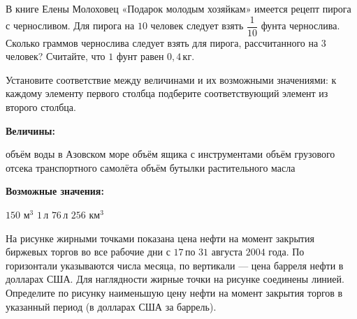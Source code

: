 \begin{class}[number=6]
	\begin{listofex}
		\item В книге Елены Молоховец «Подарок молодым хозяйкам» имеется рецепт пирога с черносливом. Для пирога на \(10\) человек следует взять \(\dfrac{ 1 }{ 10 }\) фунта чернослива. Сколько граммов чернослива следует взять для пирога, рассчитанного на \(3\) человек? Считайте, что \(1\) фунт равен \(0,4\) кг.
		\item Установите соответствие между величинами и их возможными значениями: к каждому элементу первого столбца подберите соответствующий элемент из второго столбца. \\
		\begin{minipage}[t]{0.58\linewidth}
			\textbf{Величины:}
			\begin{tasks}
				\task объём воды в Азовском море
				\task объём ящика с инструментами
				\task объём грузового отсека транспортного самолёта
				\task объём бутылки растительного масла
			\end{tasks}
		\end{minipage}
		\hspace{0.05\linewidth}
		\begin{minipage}[t]{\textwidth}
			\textbf{Возможные значения:}
			\begin{tasks}
				\task \(150\) м\(^3\)
				\task \(1\) л
				\task \(76\) л
				\task \(256\) км\(^3\)
			\end{tasks}
		\end{minipage}
		\item
		\begin{minipage}[t]{0.5\linewidth}
			На рисунке жирными точками показана цена нефти на момент закрытия биржевых торгов во все рабочие дни с \(17\) по \(31\) августа \(2004\) года. По горизонтали указываются числа месяца, по вертикали --- цена барреля нефти в долларах США. Для наглядности жирные точки на рисунке соединены линией. Определите по рисунку наименьшую цену нефти на момент закрытия торгов в указанный период (в долларах США за баррель).
		\end{minipage}
		\hspace{0.02\linewidth}
		\begin{minipage}[t]{0.45\linewidth}

\end{minipage}
\end{listofex}
\end{class}
